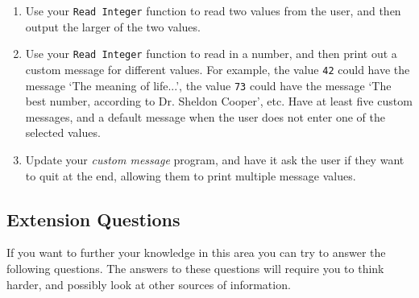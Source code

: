\begin{enumerate}
  \item Use your \texttt{Read Integer} function to read two values from the user, and then output the larger of the two values.
  
  \item Use your \texttt{Read Integer} function to read in a number, and then print out a custom message for different values. For example, the value \texttt{42} could have the message `The meaning of life...', the value \texttt{73} could have the message `The best number, according to Dr. Sheldon Cooper', etc. Have at least five custom messages, and a default message when the user does not enter one of the selected values.
  
  \item Update your \emph{custom message} program, and have it ask the user if they want to quit at the end, allowing them to print multiple message values.
\end{enumerate}
\clearpage

\subsection{Extension Questions} %
\label{sub:extension_questions_flow}

If you want to further your knowledge in this area you can try to answer the following questions. The answers to these questions will require you to think harder, and possibly look at other sources of information.

